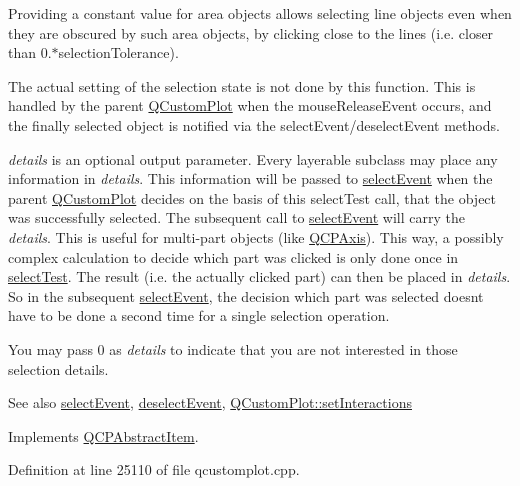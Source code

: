 Providing a constant value for area objects allows selecting line objects even when they are obscured by such area objects, by clicking close to the lines (i.\+e. closer than 0.$\ast$selection\+Tolerance).

The actual setting of the selection state is not done by this function. This is handled by the parent \hyperlink{class_q_custom_plot}{Q\+Custom\+Plot} when the mouse\+Release\+Event occurs, and the finally selected object is notified via the select\+Event/deselect\+Event methods.

{\itshape details} is an optional output parameter. Every layerable subclass may place any information in {\itshape details}. This information will be passed to \hyperlink{class_q_c_p_abstract_item_aaf92af7b9893712959a6c073d334d88d}{select\+Event} when the parent \hyperlink{class_q_custom_plot}{Q\+Custom\+Plot} decides on the basis of this select\+Test call, that the object was successfully selected. The subsequent call to \hyperlink{class_q_c_p_abstract_item_aaf92af7b9893712959a6c073d334d88d}{select\+Event} will carry the {\itshape details}. This is useful for multi-\/part objects (like \hyperlink{class_q_c_p_axis}{Q\+C\+P\+Axis}). This way, a possibly complex calculation to decide which part was clicked is only done once in \hyperlink{class_q_c_p_item_ellipse_acd7e5f9528630b2ab5987e2a5782eb7c}{select\+Test}. The result (i.\+e. the actually clicked part) can then be placed in {\itshape details}. So in the subsequent \hyperlink{class_q_c_p_abstract_item_aaf92af7b9893712959a6c073d334d88d}{select\+Event}, the decision which part was selected doesn\textquotesingle{}t have to be done a second time for a single selection operation.

You may pass 0 as {\itshape details} to indicate that you are not interested in those selection details.

\begin{DoxySeeAlso}{See also}
\hyperlink{class_q_c_p_abstract_item_aaf92af7b9893712959a6c073d334d88d}{select\+Event}, \hyperlink{class_q_c_p_abstract_item_a91f090d6763cfedb0749219c63788ae9}{deselect\+Event}, \hyperlink{class_q_custom_plot_a5ee1e2f6ae27419deca53e75907c27e5}{Q\+Custom\+Plot\+::set\+Interactions} 
\end{DoxySeeAlso}


Implements \hyperlink{class_q_c_p_abstract_item_a96d522d10ffc0413b9a366c6f7f0476b}{Q\+C\+P\+Abstract\+Item}.



Definition at line 25110 of file qcustomplot.\+cpp.




